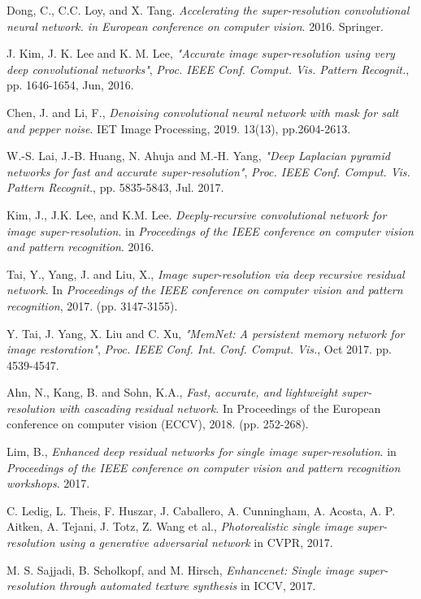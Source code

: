 \documentclass[twocolumn]{svjour3}          %
\begin{document}
\begin{thebibliography}{00}
 Dong, C., C.C. Loy, and X. Tang. \textit{Accelerating the super-resolution convolutional neural network. in European conference on computer vision}. 2016. Springer.

 J. Kim, J. K. Lee and K. M. Lee, \textit{"Accurate image super-resolution using very deep convolutional networks"}, \textit{Proc. IEEE Conf. Comput. Vis. Pattern Recognit.}, pp. 1646-1654, Jun, 2016.

 Chen, J. and Li, F., \textit{Denoising convolutional neural network with mask for salt and pepper noise}. IET Image Processing, 2019. 13(13), pp.2604-2613.

 W.-S. Lai, J.-B. Huang, N. Ahuja and M.-H. Yang, \textit{"Deep Laplacian pyramid networks for fast and accurate super-resolution"}, \textit{Proc. IEEE Conf. Comput. Vis. Pattern Recognit.}, pp. 5835-5843, Jul. 2017.

 Kim, J., J.K. Lee, and K.M. Lee. \textit{Deeply-recursive convolutional network for image super-resolution}. in \textit{Proceedings of the IEEE conference on computer vision and pattern recognition}. 2016.

 Tai, Y., Yang, J. and Liu, X., \textit{Image super-resolution via deep recursive residual network}. In \textit{Proceedings of the IEEE conference on computer vision and pattern recognition}, 2017. (pp. 3147-3155).

 Y. Tai, J. Yang, X. Liu and C. Xu, \textit{"MemNet: A persistent memory network for image restoration"}, \textit{Proc. IEEE Conf. Int. Conf. Comput. Vis.}, Oct 2017. pp. 4539-4547. 

 Ahn, N., Kang, B. and Sohn, K.A., \textit{Fast, accurate, and lightweight super-resolution with cascading residual network.} In Proceedings of the European conference on computer vision (ECCV), 2018. (pp. 252-268).

 Lim, B., \textit{Enhanced deep residual networks for single image super-resolution}. in \textit{Proceedings of the IEEE conference on computer vision and pattern recognition workshops}. 2017.

 C. Ledig, L. Theis, F. Huszar, J. Caballero, A. Cunningham, A. Acosta, A. P. Aitken, A. Tejani, J. Totz, Z. Wang et al., \textit{Photorealistic single image super-resolution using a generative adversarial network} in CVPR, 2017.

 M. S. Sajjadi, B. Scholkopf, and M. Hirsch, \textit{Enhancenet: Single image super-resolution through automated texture synthesis} in ICCV, 2017.


\end{thebibliography}
\end{document}
